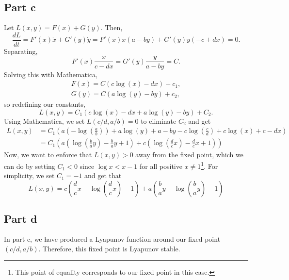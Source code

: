 \documentclass{article}
\begin{document}
\subsection{Part c}
Let $L(x,y) = F(x) + G(y)$. Then,
\[
\frac{dL}{dt}=F'(x)\dot{x}+G'(y)\dot{y}=F'(x)x(a-by)+G'(y)y(-c+dx)=0.
\]
Separating,
\[
F'(x)\frac{x}{c-dx}=G'(y)\frac{y}{a-by}=C.
\]
Solving this with Mathematica,
\begin{align*}
F(x)=C (c \log (x)-d x)+c_1,\\
G(y)=C (a \log (y)-b y)+c_2,
\end{align*}
so redefining our constants,
\[
L(x,y)=C_1(c \log (x)-d x+a \log (y)-b y)+C_2.
\]
Using Mathematica, we set $L(c/d,a/b)=0$ to eliminate $C_2$ and get 
\begin{align*}
L(x,y)&=C_1 \left(a \left(-\log \left(\frac{a}{b}\right)\right)+a \log (y)+a-b y-c \log \left(\frac{c}{d}\right)+c \log (x)+c-d x\right)\\&=
C_1\left(a \left(\log \left(\frac{b}{a}y\right)-\frac{b}{a}y+1\right)+c \left(\log \left(\frac{d}{c}x\right)-\frac{d}{c} x+1\right)\right)
\end{align*}
Now, we want to enforce that $L(x,y)>0$ away from the fixed point, which we can do by setting $C_1<0$ since $\log x<x-1$ for all positive $x\neq1$\footnote{This point of equality corresponds to our fixed point in this case.}. For simplicity, we set $C_1=-1$ and get that
\[
L(x,y)=c \left(\frac{d}{c} x-\log \left(\frac{d}{c}x\right)-1\right)+a \left(\frac{b}{a}y-\log \left(\frac{b}{a}y\right)-1\right)
\]

\subsection{Part d}
In part c, we have produced a Lyapunov function around our fixed point $(c/d,a/b)$. Therefore, this fixed point is Lyapunov stable.
\end{document}
